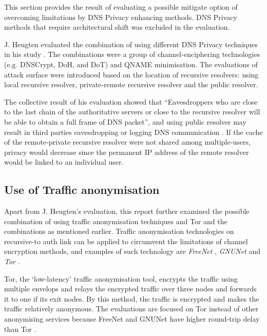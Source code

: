 This section provides the result of evaluating a possible mitigate option of overcoming limitations by DNS Privacy enhancing methods.
DNS Privacy methods that require architectural shift was excluded in the evaluation.

J. Heugten evaluated the combination of using different DNS Privacy techniques in his study \cite{van2018privacy}.
The combinations were a group of channel-enciphering technologies (e.g. DNSCrypt, DoH, and DoT) and QNAME minimisation.
The evaluations of attack surface were introduced based on the location of recursive resolvers: using local recursive resolver, private-remote recursive resolver and the public resolver.

The collective result of his evaluation showed that ``Eavesdroppers who are close to the last chain of the authoritative servers or close to the recursive resolver will be able to obtain a full frame of DNS packet'', and using public resolver may result in third parties eavesdropping or logging DNS communication \cite{van2018privacy}.
If the cache of the remote-private recursive resolver were not shared among multiple-users, privacy would decrease since the permanent IP address of the remote resolver would be linked to an individual user.

\subsection{Use of Traffic anonymisation}
Apart from J. Heugten’s evaluation, this report further examined the possible combination of using traffic anonymisation techniques and Tor and the combinations as mentioned earlier.
Traffic anonymisation technologies on recursive-to auth link can be applied to circumvent the limitations of channel encryption methods, and examples of such technology are \textit{FreeNet} \cite{clarke2001freenet}, \textit{GNUNet} \cite{grothoff2017gnunet} and \textit{Tor} \cite{dingledine2004tor}.

Tor, the `low-latency' traffic anonymisation tool, encrypts the traffic using multiple envelops and relays the encrypted traffic over three nodes and forwards it to one if its exit nodes.
By this method, the traffic is encrypted and makes the traffic relatively anonymous.
The evaluations are focused on Tor instead of other anonymising services because FreeNet and GNUNet have higher round-trip delay than Tor \cite{anonymousoverdns}.

